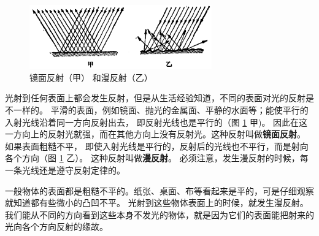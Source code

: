 \begin{figure}[htbp]
    \centering
    \includegraphics[width=0.7\textwidth]{../pic/czwl2-ch1-5}
    \caption{镜面反射（甲） 和漫反射（乙）}\label{fig:1-5}
\end{figure}

光射到任何表面上都会发生反射，但是从生活经验知道，不同的表面对光的反射是不一样的。
平滑的表面，例如镜面、抛光的金属面、平静的水面等；能使平行的入射光线沿着同一方向反射出去，
即反射光线也是平行的（图 \ref{fig:1-5} 甲)。
因此在这一方向上的反射光就强，而在其他方向上没有反射光。这种反射叫做\textbf{镜面反射}。
如果表面粗糙不平， 即使入射光线是平行的，反射后的光线也不平行，而是射向各个方向（图 \ref{fig:1-5} 乙）。
这种反射叫做\textbf{漫反射}。
必须注意，发生漫反射的时候，每一条光线还是遵守反射定律的。

一般物体的表面都是粗糙不平的。纸张、桌面、布等看起来是平的，可是仔细观察就知道都有些微小的凸凹不平。
光射到这些物体表面上的时候，就发生漫反射。
我们能从不同的方向看到这些本身不发光的物体，就是因为它们的表面能把射来的光向各个方向反射的缘故。

